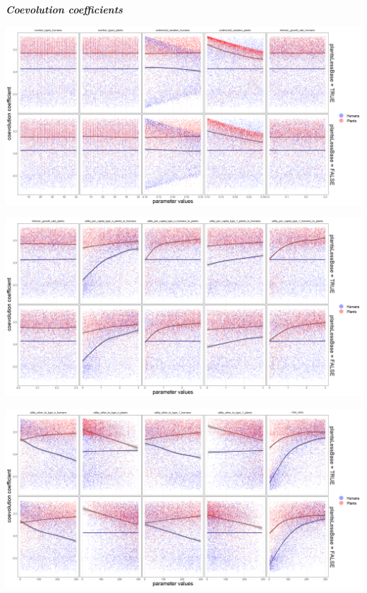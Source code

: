 \documentclass[
]{book}
\begin{document}

\textbf{\emph{Coevolution coefficients}}

\includegraphics[width=1\linewidth]{plots/5_LHS_plantsLessBase_coevolution_coefficients_bifurcationPlot_twoVariables_per_parameter_and_scenario_part1}

\includegraphics[width=1\linewidth]{plots/5_LHS_plantsLessBase_coevolution_coefficients_bifurcationPlot_twoVariables_per_parameter_and_scenario_part2}

\includegraphics[width=1\linewidth]{plots/5_LHS_plantsLessBase_coevolution_coefficients_bifurcationPlot_twoVariables_per_parameter_and_scenario_part3}
\end{document}
